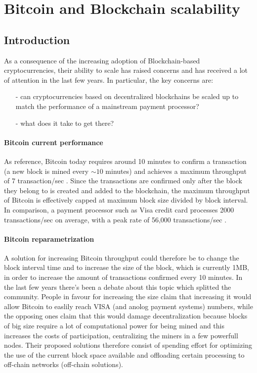 \section{Bitcoin and Blockchain scalability}
\subsection{Introduction}
As a consequence of the increasing adoption of Blockchain-based cryptocurrencies,
their ability to scale has raised concerns and has received a lot of attention
in the last few years. In particular, the key concerns are:
\begin{itemize}
  \item[-] can cryptocurrencies based on decentralized blockchains be scaled up
  to match the performance of a mainstream payment processor?
  \item[-] what does it take to get there?
\end{itemize}

\paragraph{Bitcoin current performance} As reference, Bitcoin today requires
around 10 minutes to confirm a transaction (a new block is mined every $\sim10$
minutes) and achieves a maximum throughput of 7 transaction/sec
\cite{wikipedia_scalability_2018}. Since the transactions are confirmed only
after the block they belong to is created and added to the blockchain, the
maximum throughput of Bitcoin is effectively capped at maximum block size
divided by block interval. In comparison, a payment processor such as Visa
credit card processes 2000 transactions/sec on average, with a peak rate of
56,000 transactions/sec \cite{wikipedia_scalability_2018}.

\paragraph{Bitcoin reparametrization} A solution for increasing Bitcoin
throughput could therefore be to change the block interval time and to increase
the size of the block, which is currently 1MB, in order to increase the amount
of transactions confirmed every 10 minutes. In the last few years there's been a
debate about this topic which splitted the community. People in favour for
increasing the size claim that increasing it would allow Bitcoin to easlily
reach VISA (and anolog payment systems) numbers, while the opposing ones claim
that this would damage decentralization because blocks of big size require a lot
of computational power for being mined and this increases the costs of
participation, centralizing the miners in a few powerfull nodes. Their proposed
solutions therefore consist of spending effort for optimizing the use of the
current block space available and offloading certain processing to off-chain
networks (off-chain solutions).

